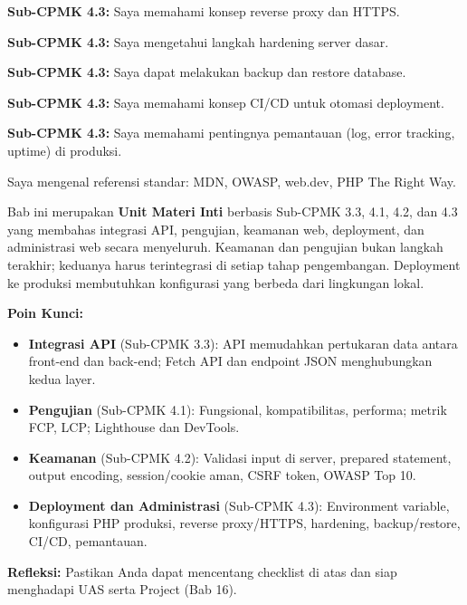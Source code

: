 \documentclass[../main.tex]{subfiles}
\begin{document}
\begin{checklist}
  \item \textbf{Sub-CPMK 4.3:} Saya memahami konsep reverse proxy dan HTTPS.
  \item \textbf{Sub-CPMK 4.3:} Saya mengetahui langkah hardening server dasar.
  \item \textbf{Sub-CPMK 4.3:} Saya dapat melakukan backup dan restore database.
  \item \textbf{Sub-CPMK 4.3:} Saya memahami konsep CI/CD untuk otomasi deployment.
  \item \textbf{Sub-CPMK 4.3:} Saya memahami pentingnya pemantauan (log, error tracking, uptime) di produksi.
  \item Saya mengenal referensi standar: MDN, OWASP, web.dev, PHP The Right Way.
\end{checklist}

\begin{rangkuman}
Bab ini merupakan \textbf{Unit Materi Inti} berbasis Sub-CPMK 3.3, 4.1, 4.2, dan 4.3 yang membahas integrasi API, pengujian, keamanan web, deployment, dan administrasi web secara menyeluruh. Keamanan dan pengujian bukan langkah terakhir; keduanya harus terintegrasi di setiap tahap pengembangan. Deployment ke produksi membutuhkan konfigurasi yang berbeda dari lingkungan lokal.

\textbf{Poin Kunci:}
\begin{itemize}
  \item \textbf{Integrasi API} (Sub-CPMK 3.3): API memudahkan pertukaran data antara front-end dan back-end; Fetch API dan endpoint JSON menghubungkan kedua layer.
  \item \textbf{Pengujian} (Sub-CPMK 4.1): Fungsional, kompatibilitas, performa; metrik FCP, LCP; Lighthouse dan DevTools.
  \item \textbf{Keamanan} (Sub-CPMK 4.2): Validasi input di server, prepared statement, output encoding, session/cookie aman, CSRF token, OWASP Top 10.
  \item \textbf{Deployment dan Administrasi} (Sub-CPMK 4.3): Environment variable, konfigurasi PHP produksi, reverse proxy/HTTPS, hardening, backup/restore, CI/CD, pemantauan.
\end{itemize}

\textbf{Refleksi:} Pastikan Anda dapat mencentang checklist di atas dan siap menghadapi UAS serta Project (Bab 16).
\end{rangkuman}

\ifSubfilesClassLoaded{
  \renewcommand{\bibname}{Daftar Pustaka}
  
  
}{}
\end{document}
